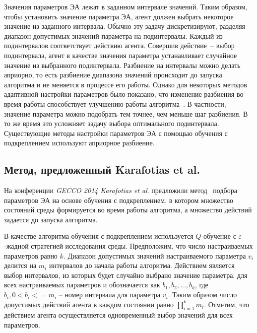 Значения параметров ЭА лежат в заданном интервале значений. Таким образом, чтобы установить значение параметра ЭА, агент должен выбрать некоторое значение из заданного интервала. Обычно эту задачу дискретизируют, разделяя диапазон допустимых значений параметра на подинтервалы. Каждый из подинтервалов соответствует действию агента. Совершив действие~-- выбор подинтервала, агент в качестве значения параметра устанавливает случайное значение из выбранного подинтервала. Разбиение на интервалы можно делать априорно, то есть разбиение диапазона значений происходит до запуска алгоритма и не меняется в процессе его работы. Однако для некоторых методов адаптивной настройки параметров было показано, что изменение разбиения во время работы способствует улучшению работы алгоритма~\cite{arpc, earpc}. В частности, значение параметра можно подобрать тем точнее, чем меньше шаг разбиения. В то же время это усложняет задачу выбора оптимального подинтервала. Существующие методы настройки параметров ЭА с помощью обучения с подкреплением используют априорное разбиение.

\subsection{Метод, предложенный Karafotias et al.}
\label{karafotias}

На конференции \textit{GECCO 2014} \textit{Karafotias et al}. предложили метод~\cite{karafotias} подбора параметров ЭА на основе обучения с подкреплением, в котором множество состояний среды формируется во время работы алгоритма, а множество действий задается до запуска алгоритма.

В качестве алгоритма обучения с подкреплением используется $Q$-обучение с $\varepsilon$-жадной стратегией исследования среды.
Предположим, что число настраиваемых параметров равно $k$. Диапазон допустимых значений настраиваемого параметра $v_i$ делится на $m_i$ интервалов до начала работы алгоритма. Действием является выбор интервалов, из которых будет случайно выбрано значение параметра, для всех настраиваемых параметров и обозначается как $b_1, b_2, \ldots, b_k$, где $b_i, 0 < b_i <= m_i$ -- номер интервала для параметра $v_i$. Таким образом число допустимых действий агента в каждом состоянии равно $\prod\limits_{i = 1}^k{m_i}$. Отметим, что действием агента осуществляется одновременный выбор значений для всех параметров. 

